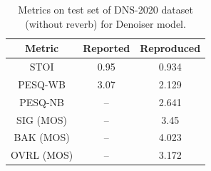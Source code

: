 \begin{table}[h]
  \centering
  \begin{tabular}{c|c|c}
    \hline
    Metric     & Reported & Reproduced \\
    \hline

    STOI       & 0.95     & 0.934      \\
    PESQ-WB    & 3.07     & 2.129      \\
    PESQ-NB    & --       & 2.641      \\
    SIG (MOS)  & --       & 3.45       \\
    BAK (MOS)  & --       & 4.023      \\
    OVRL (MOS) & --       & 3.172      \\
    \hline
  \end{tabular}
  \caption{Metrics on test set of DNS-2020 dataset (without reverb) for Denoiser model.}
  \label{tab:denoiser-test}

\end{table}